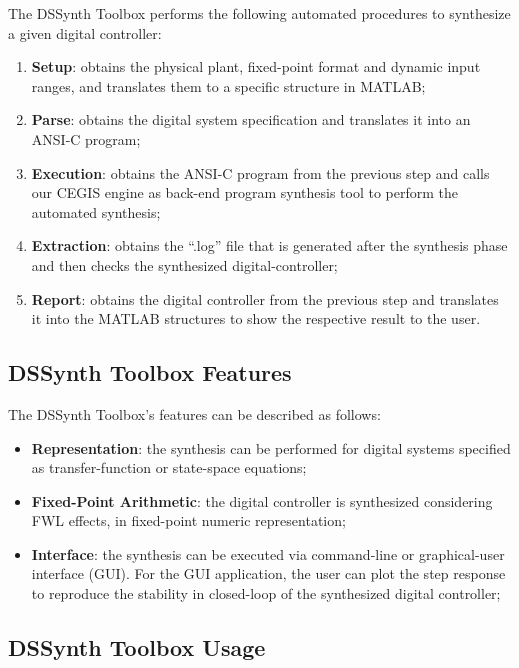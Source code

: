 \documentclass[10pt,conference]{IEEEtran}
\newcommand\tool{{DSSynth Toolbox}\xspace}
\begin{document}
The \tool performs the following automated procedures 
to synthesize a given digital controller:

\begin{enumerate}
\item \textbf{Setup}: obtains the physical plant, fixed-point format 
and dynamic input ranges, and translates them to a specific structure in MATLAB;
\item \textbf{Parse}: obtains the digital system specification and translates 
it into an ANSI-C program;
\item \textbf{Execution}: obtains the ANSI-C program from the previous step 
and calls our CEGIS engine as back-end program synthesis tool to perform the automated synthesis;
\item \textbf{Extraction}: obtains the ``.log'' file that is generated 
after the synthesis phase and then checks the synthesized digital-controller;
\item \textbf{Report}: obtains the digital controller from the previous step 
and translates it into the MATLAB structures to show the respective result to the user.
\end{enumerate}

\subsection{\tool Features}

The \tool's features can be described as follows:

\begin{itemize}
\item \textbf{Representation}: the synthesis can be 
performed for digital systems specified as 
transfer-function or state-space equations;
\item \textbf{Fixed-Point Arithmetic}: the digital 
controller is synthesized considering FWL effects, 
in fixed-point numeric representation;
\item \textbf{Interface}: the synthesis can be executed 
via command-line or graphical-user interface (GUI). 
For the GUI application, the user can plot the step response 
to reproduce the stability in closed-loop of the synthesized digital controller;
\end{itemize}

\subsection{\tool Usage}
\end{document}
